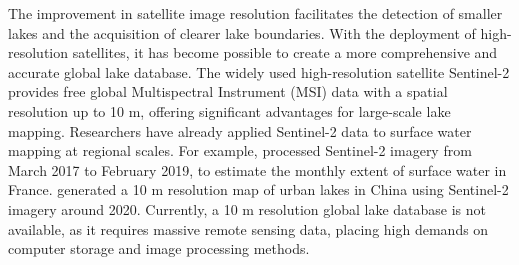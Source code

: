 \documentclass[preprint,12pt,authoryear]{elsarticle}
\begin{document}
The improvement in satellite image resolution facilitates the detection of smaller lakes and the acquisition of clearer lake boundaries. With the deployment of high-resolution satellites, it has become possible to create a more comprehensive and accurate global lake database. The widely used high-resolution satellite Sentinel-2 provides free global Multispectral Instrument (MSI) data with a spatial resolution up to 10 m, offering significant advantages for large-scale lake mapping. Researchers have already applied Sentinel-2 data to surface water mapping at regional scales. For example, \citet{yang_monthly_2020} processed Sentinel-2 imagery from March 2017 to February 2019, to estimate the monthly extent of surface water in France. \citet{song_high-resolution_2022} generated a 10 m resolution map of urban lakes in China using Sentinel-2 imagery around 2020. Currently, a 10 m resolution global lake database is not available, as it requires massive remote sensing data, placing high demands on computer storage and image processing methods.
\end{document}
